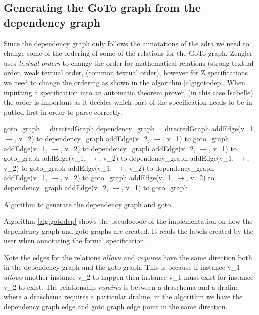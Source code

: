 \subsection{Generating the GoTo graph from the dependency graph}

Since the dependency graph only follows the annotations of the \gls{zdra} we
need to change some of the ordering of some of the relations for the GoTo graph.
Zengler \cite{zengfirstyear} uses \textit{textual orders} to change the order
for mathematical relations (strong textual order, weak textual order,
(common textual order), however for Z specifications we need to change the 
ordering as shown in the algorithm \ref{alg:gotodep}. 
When inputting a specification into an automatic theorem prover,
 (in this case Isabelle) the order is important as it decides which part of the 
 specification needs to be in-putted first in order to parse correctly. 

\begin{algorithm}[H] \underline{goto\_graph = directedGraph} \;
\underline{dependency\_graph = directedGraph} \; \SetAlgoLined
{} 
{addEdge(v\_1, $\rightarrow$, v\_2) to dependency\_graph \; addEdge(v\_2,
$\rightarrow$, v\_1)  to goto\_graph\;}
{addEdge(v\_1, $\rightarrow$, v\_2) to dependency\_graph \; addEdge(v\_2,
$\rightarrow$, v\_1)  to goto\_graph \;}
{addEdge(v\_1, $\rightarrow$, v\_2) to dependency\_graph \; addEdge(v\_1,
$\rightarrow$, v\_2)  to goto\_graph \;}
{addEdge(v\_1, $\rightarrow$, v\_2) to dependency\_graph \; addEdge(v\_1,
$\rightarrow$, v\_2)  to goto\_graph \;}
{addEdge(v\_1, $\rightarrow$, v\_2) to dependency\_graph \; addEdge(v\_2,
$\rightarrow$, v\_1)  to goto\_graph \;}
\caption{Algorithm to generate the dependency graph and goto. \label{alg:gotodep} }
\end{algorithm}
\vspace{0.2in}


Algorithm \ref{alg:gotodep} shows the pseudocode of the implementation on how
the dependency graph and goto graphs are created. It reads the labels created by
the user when annotating the formal specification. 

Note the edges for the relations \emph{allows} and \emph{requires} have the same
direction both in the dependency graph and the goto graph. This is because if
instance v\_1 \emph{allows} another instance v\_2 to happen then instance v\_1
must exist for instance v\_2 to exist. The relationship \emph{requires} is
between a draschema and a draline where a draschema requires a particular
draline, in the algorithm we have the dependency graph edge and goto graph edge
point in the same direction.

